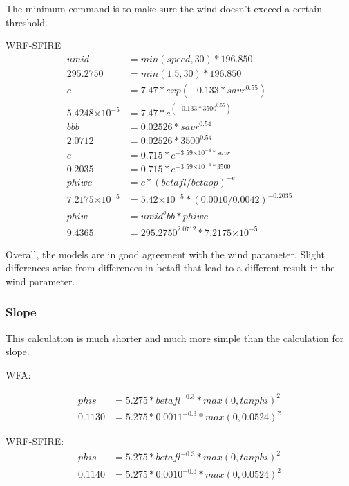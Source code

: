 \documentclass{article}
\newcommand\tenpow[1]{\ensuremath{{\times}10^{#1}}}
\begin{document}
The minimum command is to make sure the wind doesn't exceed a certain threshold. 

WRF-SFIRE
\begin{equation}
	\label{wind_WRF_umid}
	\begin{split}
		umid     &= min(speed, 30) * 196.850 \\ %
		295.2750 &= min(1.5, 30) * 196.850 \\
		c        &= 7.47 * exp(-0.133 * savr^{0.55}) \\ %
		5.4248 \tenpow{-5} &= 7.47 * e^{(-0.133 * 3500^{0.55})} \\
		bbb &= 0.02526 * savr^{0.54} \\ %
		2.0712 &= 0.02526 * 3500^{0.54} \\
		e &= 0.715 * e^{-3.59\tenpow{-4} * savr} \\ %
		0.2035 &= 0.715 * e^{-3.59\tenpow{-4} * 3500} \\
		phiwc    &= c * (betafl/betaop)^{-e} \\
		7.2175\tenpow{-5} &= 5.42 \tenpow{-5} * (0.0010/0.0042)^{-0.2035} \\
		phiw     &= umid^bbb * phiwc \\
		9.4365 &= 295.2750 ^ {2.0712} * 7.2175\tenpow{-5}
	\end{split}
\end{equation}

Overall, the models are in good agreement with the wind parameter. Slight differences arise from differences in betafl that lead to a different result in the wind parameter. 

\subsubsection*{Slope}

This calculation is much shorter and much more simple than the calculation for slope. 

WFA: 

\begin{equation}
\label{slope_WFA}
	\begin{split}
		phis &= 5.275 * betafl^{-0.3} * max(0,tanphi)^2 \\
		0.1130 &= 5.275 * 0.0011^{-0.3} * max(0,0.0524)^2
	\end{split}
\end{equation}


WRF-SFIRE:
\begin{equation}
\label{slope_WRF}
	\begin{split}
		phis &= 5.275 * betafl^{-0.3} * max(0,tanphi)^2 \\
		0.1140 &= 5.275 * 0.0010^{-0.3} * max(0,0.0524)^2
	\end{split}
\end{equation}
\end{document}
